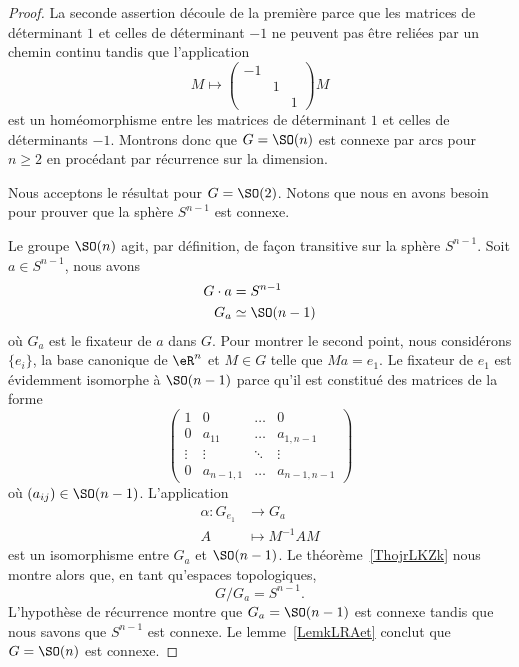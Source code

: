 \begin{proof}
	La seconde assertion découle de la première parce que les matrices de déterminant \( 1\) et celles de déterminant \( -1\) ne peuvent pas être reliées par un chemin continu tandis que l'application
	\begin{equation}
		M\mapsto \begin{pmatrix}
			-1 &   &   \\
			   & 1 &   \\
			   &   & 1
		\end{pmatrix}M
	\end{equation}
	est un homéomorphisme entre les matrices de déterminant \( 1\) et celles de déterminants \( -1\). Montrons donc que \( G=\SO(n)\) est connexe par arcs pour \( n\geq 2\) en procédant par récurrence sur la dimension.

	Nous acceptons le résultat pour \( G=\SO(2)\). Notons que nous en avons besoin pour prouver que la sphère \( S^{n-1}\) est connexe.

	Le groupe \( \SO(n)\) agit, par définition, de façon transitive sur la sphère \( S^{n-1}\). Soit \( a\in S^{n-1}\), nous avons
	\begin{subequations}
		\begin{align}
			G\cdot a & =S^{n-1}        \\
			G_a      & \simeq \SO(n-1)
		\end{align}
	\end{subequations}
	où \( G_a\) est le fixateur de \( a\) dans \( G\). Pour montrer le second point, nous considérons \( \{ e_i \}\), la base canonique de \( \eR^n\) et \( M\in G\) telle que \( Ma=e_1\). Le fixateur de \( e_1\) est évidemment isomorphe à \( \SO(n-1)\) parce qu'il est constitué des matrices de la forme
	\begin{equation}
		\begin{pmatrix}
			1      & 0         & \ldots & 0           \\
			0      & a_{11}    & \ldots & a_{1,n-1}   \\
			\vdots & \vdots    & \ddots & \vdots      \\
			0      & a_{n-1,1} & \ldots & a_{n-1,n-1}
		\end{pmatrix}
	\end{equation}
	où \( (a_{ij})\in \SO(n-1)\). L'application
	\begin{equation}
		\begin{aligned}
			\alpha\colon G_{e_1} & \to G_{a}         \\
			A                    & \mapsto M^{-1}A M
		\end{aligned}
	\end{equation}
	est un isomorphisme entre \( G_a\) et \( \SO(n-1)\). Le théorème~\ref{ThojrLKZk} nous montre alors que, en tant qu'espaces topologiques,
	\begin{equation}
		G/G_a=S^{n-1}.
	\end{equation}
	L'hypothèse de récurrence montre que \( G_a=\SO(n-1)\) est connexe tandis que nous savons que \( S^{n-1}\) est connexe. Le lemme~\ref{LemkLRAet} conclut que \( G=\SO(n)\) est connexe.
\end{proof}

